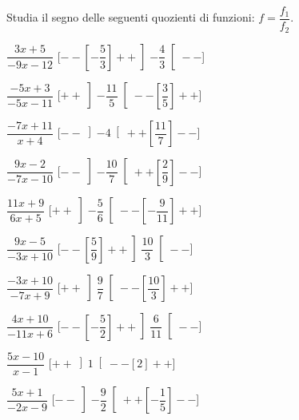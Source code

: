 \begin{esercizio}\label{ese:dis_8}
 Studia il segno delle seguenti quozienti di funzioni: 
 \(f = \dfrac {f_1}{f_2}\).
\begin{htmulticols}{2}
 \begin{enumeratea}
  \item  \(\dfrac{3 x +5}{-9 x -12}\) \hfill 
  [\(--\left [-\dfrac{5}{3} \right ]++\left ]-\dfrac{4}{3} \right [--\)]
  \item  \(\dfrac{-5 x +3}{-5 x -11}\) \hfill 
  [\(++\left ]-\dfrac{11}{5} \right [--\left [\dfrac{3}{5} \right ]++\)]
  \item  \(\dfrac{-7 x +11}{x +4}\) \hfill 
  [\(--\left ]-4 \right [++\left [\dfrac{11}{7} \right ]--\)]
  \item  \(\dfrac{9 x -2}{-7 x -10}\) \hfill 
  [\(--\left ]-\dfrac{10}{7} \right [++\left [\dfrac{2}{9} \right ]--\)]
  \item  \(\dfrac{11 x +9}{6 x +5}\) \hfill 
  [\(++\left ]-\dfrac{5}{6} \right [--\left [-\dfrac{9}{11} \right ]++\)]
  \item  \(\dfrac{9 x -5}{-3 x +10}\) \hfill 
  [\(--\left [\dfrac{5}{9} \right ]++\left ]\dfrac{10}{3} \right [--\)]
  \item  \(\dfrac{-3 x +10}{-7 x +9}\) \hfill 
  [\(++\left ]\dfrac{9}{7} \right [--\left [\dfrac{10}{3} \right ]++\)]
  \item  \(\dfrac{4 x +10}{-11 x +6}\) \hfill 
  [\(--\left [-\dfrac{5}{2} \right ]++\left ]\dfrac{6}{11} \right [--\)]
  \item  \(\dfrac{5 x -10}{x -1}\) \hfill 
  [\(++\left ]1 \right [--\left [2 \right ]++\)]
  \item  \(\dfrac{5 x +1}{-2 x -9}\) \hfill 
  [\(--\left ]-\dfrac{9}{2} \right [++\left [-\dfrac{1}{5} \right ]--\)]
 \end{enumeratea}
\end{htmulticols}
\end{esercizio}

\subsubsection*{}

